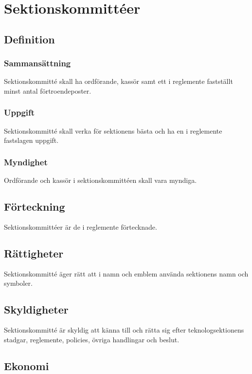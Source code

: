\section{Sektionskommittéer}

\subsection{Definition}

\subsubsection{Sammansättning}
Sektionskommitté skall ha ordförande, kassör samt ett i reglemente fastställt minst antal förtroendeposter.

\subsubsection{Uppgift}
Sektionskommitté skall verka för sektionens bästa och ha en i reglemente fastslagen uppgift.

\subsubsection{Myndighet}
Ordförande och kassör i sektionskommittéen skall vara myndiga.

\subsection{Förteckning}

Sektionskommittéer är de i reglemente förtecknade.

\subsection{Rättigheter}

Sektionskommitté äger rätt att i namn och emblem använda sektionens namn och symboler.

\subsection{Skyldigheter}

Sektionskommitté är skyldig att känna till och rätta sig efter teknologsektionens stadgar, reglemente, policies, övriga handlingar och beslut.

\subsection{Ekonomi}
